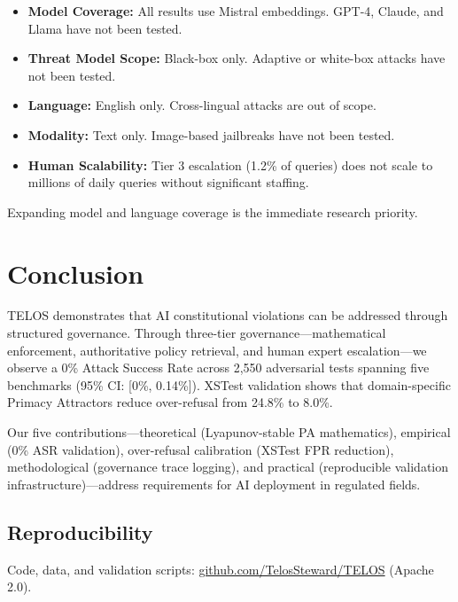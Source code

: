 \documentclass[11pt,twocolumn]{article}
\begin{document}
\begin{itemize}
    \item \textbf{Model Coverage:} All results use Mistral embeddings. GPT-4, Claude, and Llama have not been tested.
    \item \textbf{Threat Model Scope:} Black-box only. Adaptive or white-box attacks have not been tested.
    \item \textbf{Language:} English only. Cross-lingual attacks are out of scope.
    \item \textbf{Modality:} Text only. Image-based jailbreaks have not been tested.
    \item \textbf{Human Scalability:} Tier 3 escalation (1.2\% of queries) does not scale to millions of daily queries without significant staffing.
\end{itemize}

Expanding model and language coverage is the immediate research priority.

\section{Conclusion}

TELOS demonstrates that AI constitutional violations can be addressed through structured governance. Through three-tier governance---mathematical enforcement, authoritative policy retrieval, and human expert escalation---we observe a 0\% Attack Success Rate across 2,550 adversarial tests spanning five benchmarks (95\% CI: [0\%, 0.14\%]). XSTest validation shows that domain-specific Primacy Attractors reduce over-refusal from 24.8\% to 8.0\%.

Our five contributions---theoretical (Lyapunov-stable PA mathematics), empirical (0\% ASR validation), over-refusal calibration (XSTest FPR reduction), methodological (governance trace logging), and practical (reproducible validation infrastructure)---address requirements for AI deployment in regulated fields.

\subsection{Reproducibility}

Code, data, and validation scripts: \url{github.com/TelosSteward/TELOS} (Apache 2.0).
\end{document}
